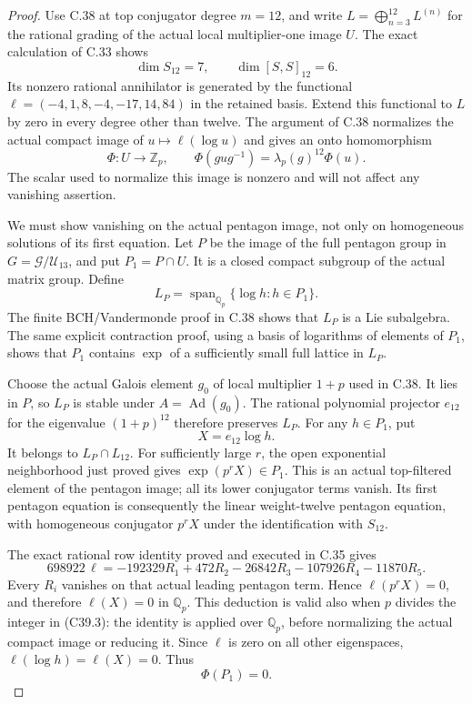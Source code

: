 \begin{proof}
Use C.38 at top conjugator degree \(m=12\), and write
\(L=\bigoplus_{n=3}^{12}L^{(n)}\) for the rational grading
of the actual local multiplier-one image \(U\).
The exact calculation of C.33 shows
\[
       \dim S_{12}=7,\qquad
       \dim[S,S]_{12}=6.
\]
Its nonzero rational annihilator is generated by the
functional \(\ell=(-4,1,8,-4,-17,14,84)\) in the
retained basis.
Extend this functional to \(L\) by zero in every degree
other than twelve.
The argument of C.38 normalizes the actual compact image
of \(u\mapsto\ell(\log u)\) and gives an onto homomorphism
\[
       \Phi:U\longrightarrow\mathbb Z_p,\qquad
       \Phi(gug^{-1})=\lambda_p(g)^{12}\Phi(u).
                                                               \tag{C39.2}
\]
The scalar used to normalize this image is nonzero and
will not affect any vanishing assertion.

We must show vanishing on the actual pentagon image, not
only on homogeneous solutions of its first equation.
Let \(P\) be the image of the full pentagon group in
\(G=\mathcal G/\mathcal U_{13}\), and put \(P_1=P\cap U\).
It is a closed compact subgroup of the actual matrix group.
Define
\[
          L_P=\operatorname{span}_{\mathbb Q_p}
                                      \{\log h:h\in P_1\}.
\]
The finite BCH/Vandermonde proof in C.38 shows that \(L_P\)
is a Lie subalgebra.  The same explicit contraction proof,
using a basis of logarithms of elements of \(P_1\), shows
that \(P_1\) contains \(\exp\) of a sufficiently small full
lattice in \(L_P\).

Choose the actual Galois element \(g_0\) of local multiplier
\(1+p\) used in C.38.
It lies in \(P\), so \(L_P\) is stable under
\(A=\operatorname{Ad}(g_0)\).
The rational polynomial projector \(e_{12}\) for the
eigenvalue \((1+p)^{12}\) therefore preserves \(L_P\).
For any \(h\in P_1\), put
\[
                         X=e_{12}\log h .
\]
It belongs to \(L_P\cap L_{12}\).
For sufficiently large \(r\), the open exponential
neighborhood just proved gives
\(\exp(p^rX)\in P_1\).
This is an actual top-filtered element of the pentagon
image; all its lower conjugator terms vanish.
Its first pentagon equation is consequently the linear
weight-twelve pentagon equation, with homogeneous
conjugator \(p^rX\) under the identification with \(S_{12}\).

The exact rational row identity proved and executed in
C.35 gives
\[
 698922\,\ell
   =-192329R_1+472R_2-26842R_3-107926R_4-11870R_5.
                                                               \tag{C39.3}
\]
Every \(R_i\) vanishes on that actual leading pentagon
term.  Hence \(\ell(p^rX)=0\), and therefore
\(\ell(X)=0\) in \(\mathbb Q_p\).
This deduction is valid also when \(p\) divides the
integer in (C39.3): the identity is applied over
\(\mathbb Q_p\), before normalizing the actual compact
image or reducing it.
Since \(\ell\) is zero on all other eigenspaces,
\(\ell(\log h)=\ell(X)=0\).
Thus
\[
                              \Phi(P_1)=0.                     \tag{C39.4}
\]


\end{proof}
